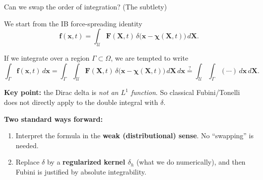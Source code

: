 \documentclass{beamer}
\begin{document}
\begin{frame}{Can we swap the order of integration? (The subtlety)}
\footnotesize

We start from the IB force-spreading identity
\[
\mathbf{f}(\mathbf{x},t)=\int_{\mathcal U}\mathbf{F}(\mathbf{X},t)\,
\delta\!\big(\mathbf{x}-\boldsymbol{\chi}(\mathbf{X},t)\big)\,d\mathbf{X}.
\]

\medskip
If we integrate over a region $\Gamma\subset\Omega$, we are tempted to write
\[
\int_{\Gamma}\mathbf{f}(\mathbf{x},t)\,d\mathbf{x}
=
\int_{\Gamma}\int_{\mathcal U}\mathbf{F}(\mathbf{X},t)\,
\delta\!\big(\mathbf{x}-\boldsymbol{\chi}(\mathbf{X},t)\big)\,d\mathbf{X}\,d\mathbf{x}
\overset{?}{=}
\int_{\mathcal U}\int_{\Gamma}(\cdots)\,d\mathbf{x}\,d\mathbf{X}.
\]

\medskip
\textbf{Key point:} the Dirac delta is \emph{not an $L^1$ function}. So classical Fubini/Tonelli
does not directly apply to the double integral with $\delta$.

\medskip
\textbf{Two standard ways forward:}
\begin{enumerate}\itemsep2pt
\item Interpret the formula in the \textbf{weak (distributional) sense}. No ``swapping'' is needed.
\item Replace $\delta$ by a \textbf{regularized kernel $\delta_h$} (what we do numerically),
      and then Fubini is justified by absolute integrability.
\end{enumerate}

\end{frame}
\end{document}
